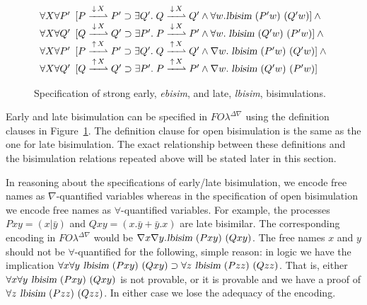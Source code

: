 \documentclass{acmtrans2m}
\newcommand{\FOL   }{FO\lambda}
\newcommand{\FOLDNb}{\FOL^{\Delta\nabla}}
\newcommand{\lbisim}[2]{\hbox{\sl lbisim}~#1~#2}
\newcommand{\iand}{\wedge}
\newcommand{\iexists}{\exists}
\newcommand{\iforall}{\forall}
\newcommand{\iimp}{\supset}
\newcommand{\inact}{\mathop{\downarrow}}
\newcommand{\oimp}{\supset}
\newcommand{\onep }[3]{#1\stackrel{#2}{-\!\!-\!\!\!\rightharpoonup} #3}
\newcommand{\outact}{\mathop{\uparrow}}
\begin{document}
\begin{figure}
{$$\begin{array}[t]{l}
\begin{array}[t]{l}
    \end{array} \\    
 \iforall X\iforall P'
    \begin{array}[t]{l}
      [\onep{P}{\inact X}{P'}\iimp\iexists Q'.\;\onep{Q}{\inact X}{Q'}
          \iand\iforall w. \lbisim{(P' w)}{(Q' w)}]\iand\null
    \end{array} \\
 \iforall X\iforall Q'
    \begin{array}[t]{l}
      [\onep{Q}{\inact X}{Q'}\iimp\iexists P'.\;\onep{P}{\inact X}{P'}
          \iand\iforall w.\; \lbisim{(Q' w)}{(P' w)}]\iand\null
    \end{array} \\    
 \iforall X \iforall P'
    \begin{array}[t]{l}
      [\onep{P}{\outact X}{P'}\iimp\iexists Q'.\;\onep{Q}{\outact X}{Q'}
         \iand\nabla w.\; \lbisim{(P' w)}{(Q' w)}]\iand\null
    \end{array}\\
 \iforall X \iforall Q'
    \begin{array}[t]{l}
      [\onep{Q}{\outact X}{Q'}\iimp\iexists P'.\;\onep{P}{\outact X}{P'}
         \iand\nabla w.\; \lbisim{(Q' w)}{(P' w)}]\quad
    \end{array}    
\end{array}
$$
}
\caption{Specification of strong early, {\sl ebisim}, and late, {\sl
    lbisim}, bisimulations.}
\label{bisim}
\end{figure}

Early and late bisimulation can be specified in $\FOLDNb$ using the
definition clauses in Figure~\ref{bisim}.  The definition clause for
open bisimulation is the same as the one for late bisimulation.  The
exact relationship between these definitions and the bisimulation
relations repeated above will be stated later in this section.

In reasoning about the specifications of early/late bisimulation, we encode
free names as $\nabla$-quantified variables whereas in the
specification of open bisimulation we encode free names as
$\forall$-quantified variables.  For example, the processes $P x y =
(x | \bar{y})$ and $Q x y = (x.\bar{y} + \bar{y}.x)$ are late
bisimilar. The corresponding encoding in $\FOLDNb$ would be $\nabla x
\nabla y. \lbisim{(Pxy)}{(Qxy)}$.  The free names $x$ and $y$ should
not be $\forall$-quantified for the following, simple reason: in logic
we have the implication $\forall x \forall y\ \lbisim{(P x y)}{(Q x
y)} \oimp \forall z\ \lbisim{(P z z)}{(Q z z)}$.  That is, either
$\forall x\forall y\ \lbisim{(Pxy)}{(Qxy)}$ is not provable, or it is
provable and we have a proof of $\forall z\ \lbisim{(Pzz)}{(Qzz)}$. In
either case we lose the adequacy of the encoding.
\end{document}
